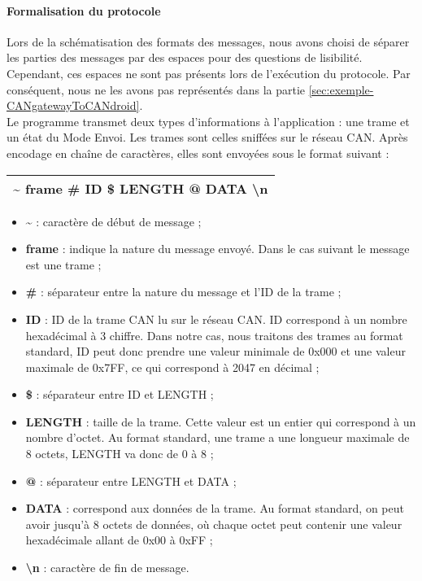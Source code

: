\paragraph{Formalisation du protocole}
\label{sec:formalisation-protocole-CANgatewayToCANdroid}

Lors de la schématisation des formats des messages, nous avons choisi de séparer les parties des messages par des espaces pour des questions de lisibilité. Cependant, ces espaces ne sont pas présents lors de l'exécution du protocole. Par conséquent, nous ne les avons pas représentés dans la partie \ref{sec:exemple-CANgatewayToCANdroid}.\\

Le programme {\nomLogiciel} transmet deux types d'informations à l'application {\nomApplication} : une trame et un état du Mode Envoi. Les trames sont celles sniffées sur le réseau CAN. Après encodage en chaîne de caractères, elles sont envoyées sous le format suivant : \\

\begin{minipage}
    \textwidth
    \centering
    \begin{tabular}{|c|}
        \hline
        \textasciitilde{} frame \# ID \$ LENGTH @ DATA \textbackslash n\\
        \hline
    \end{tabular}
\end{minipage}

\medspace

\begin{itemize}
    \item \textbf{\textasciitilde{}} : caractère de début de message ;
    \item \textbf{frame} : indique la nature du message envoyé. Dans le cas suivant le message est une trame ;
    \item \textbf{\#} : séparateur entre la nature du message et l'ID de la trame ;
    \item \textbf{ID} : ID de la trame CAN lu sur le réseau CAN. ID correspond à un nombre hexadécimal à 3 chiffre. Dans notre cas, nous traitons des trames au format standard, ID peut donc prendre une valeur minimale de 0x000 et une valeur maximale de 0x7FF, ce qui correspond à 2047 en décimal ;
    \item \textbf{\$} : séparateur entre ID et LENGTH ;
    \item \textbf{LENGTH} : taille de la trame. Cette valeur est un entier qui correspond à un nombre d'octet. Au format standard, une trame a une longueur maximale de 8 octets, LENGTH va donc de 0 à 8 ;
    \item \textbf{@} : séparateur entre LENGTH et DATA ;
    \item \textbf{DATA} : correspond aux données de la trame. Au format standard, on peut avoir jusqu'à 8 octets de données, où chaque octet peut contenir une valeur hexadécimale allant de 0x00 à 0xFF ;
    \item \textbf{\textbackslash n} : caractère de fin de message.\\
\end{itemize}

